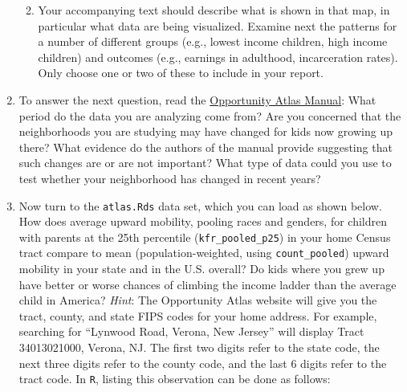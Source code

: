 \documentclass[]{book}
\newenvironment{Shaded}{\begin{snugshade}}{\end{snugshade}}
\newcommand{\FunctionTok}[1]{\textcolor[rgb]{0.00,0.00,0.00}{#1}}
\newcommand{\NormalTok}[1]{#1}
\begin{document}
\begin{enumerate}
\begin{enumerate}
\begin{Shaded}
\end{Shaded}
  \item
    Your accompanying text should describe what is shown in that map, in
    particular what data are being visualized. Examine next the patterns
    for a number of different groups (e.g., lowest income children, high
    income children) and outcomes (e.g., earnings in adulthood,
    incarceration rates). Only choose one or two of these to include in
    your report.
  \end{enumerate}
\item
  To answer the next question, read the
  \href{https://opportunityinsights.org/wp-content/uploads/2018/10/atlas_paper.pdf}{Opportunity
  Atlas Manual}: What period do the data you are analyzing come from?
  Are you concerned that the neighborhoods you are studying may have
  changed for kids now growing up there? What evidence do the authors of
  the manual provide suggesting that such changes are or are not
  important? What type of data could you use to test whether your
  neighborhood has changed in recent years?
\item
  Now turn to the \texttt{atlas.Rds} data set, which you can load as
  shown below. How does average upward mobility, pooling races and
  genders, for children with parents at the 25th percentile
  (\texttt{kfr\_pooled\_p25}) in your home Census tract compare to mean
  (population-weighted, using \texttt{count\_pooled}) upward mobility in
  your state and in the U.S. overall? Do kids where you grew up have
  better or worse chances of climbing the income ladder than the average
  child in America? \emph{Hint}: The Opportunity Atlas website will give
  you the tract, county, and state FIPS codes for your home address. For
  example, searching for ``Lynwood Road, Verona, New Jersey'' will
  display Tract 34013021000, Verona, NJ. The first two digits refer to
  the state code, the next three digits refer to the county code, and
  the last 6 digits refer to the tract code. In \texttt{R}, listing this
  observation can be done as follows:


\end{enumerate}
\end{document}
